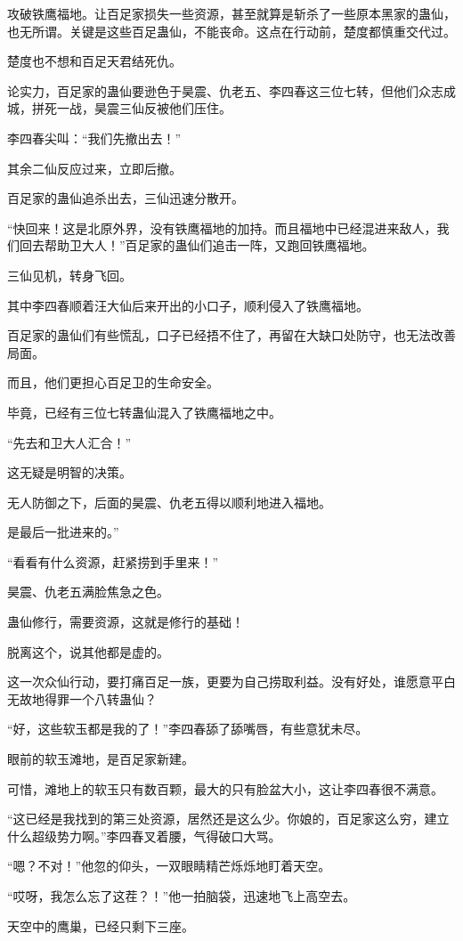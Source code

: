 \begin{this_body}
攻破铁鹰福地。让百足家损失一些资源，甚至就算是斩杀了一些原本黑家的蛊仙，也无所谓。关键是这些百足蛊仙，不能丧命。这点在行动前，楚度都慎重交代过。

楚度也不想和百足天君结死仇。

论实力，百足家的蛊仙要逊色于昊震、仇老五、李四春这三位七转，但他们众志成城，拼死一战，昊震三仙反被他们压住。

李四春尖叫：“我们先撤出去！”

其余二仙反应过来，立即后撤。

百足家的蛊仙追杀出去，三仙迅速分散开。

“快回来！这是北原外界，没有铁鹰福地的加持。而且福地中已经混进来敌人，我们回去帮助卫大人！”百足家的蛊仙们追击一阵，又跑回铁鹰福地。

三仙见机，转身飞回。

其中李四春顺着汪大仙后来开出的小口子，顺利侵入了铁鹰福地。

百足家的蛊仙们有些慌乱，口子已经捂不住了，再留在大缺口处防守，也无法改善局面。

而且，他们更担心百足卫的生命安全。

毕竟，已经有三位七转蛊仙混入了铁鹰福地之中。

“先去和卫大人汇合！”

这无疑是明智的决策。

无人防御之下，后面的昊震、仇老五得以顺利地进入福地。

是最后一批进来的。”

“看看有什么资源，赶紧捞到手里来！”

昊震、仇老五满脸焦急之色。

蛊仙修行，需要资源，这就是修行的基础！

脱离这个，说其他都是虚的。

这一次众仙行动，要打痛百足一族，更要为自己捞取利益。没有好处，谁愿意平白无故地得罪一个八转蛊仙？

“好，这些软玉都是我的了！”李四春舔了舔嘴唇，有些意犹未尽。

眼前的软玉滩地，是百足家新建。

可惜，滩地上的软玉只有数百颗，最大的只有脸盆大小，这让李四春很不满意。

“这已经是我找到的第三处资源，居然还是这么少。你娘的，百足家这么穷，建立什么超级势力啊。”李四春叉着腰，气得破口大骂。

“嗯？不对！”他忽的仰头，一双眼睛精芒烁烁地盯着天空。

“哎呀，我怎么忘了这茬？！”他一拍脑袋，迅速地飞上高空去。

天空中的鹰巢，已经只剩下三座。


\end{this_body}
